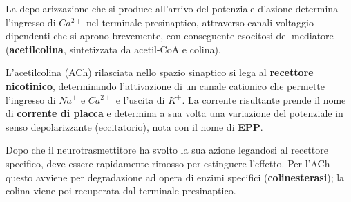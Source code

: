 La depolarizzazione che si produce all'arrivo del potenziale d'azione determina l'ingresso di $Ca^{2+}$ nel terminale presinaptico, attraverso canali voltaggio-dipendenti che si aprono brevemente, con conseguente esocitosi del mediatore (\textbf{acetilcolina}, sintetizzata da acetil-CoA e colina).

L'acetilcolina (ACh) rilasciata nello spazio sinaptico si lega al \textbf{recettore nicotinico}, determinando l'attivazione di un canale cationico che permette l'ingresso di $Na^+$ e $Ca^{2+}$ e l'uscita di $K^+$. La corrente risultante prende il nome di \textbf{corrente di placca} e determina a sua volta una variazione del potenziale in senso depolarizzante (eccitatorio), nota con il nome di \textbf{EPP}.

Dopo che il neurotrasmettitore ha svolto la sua azione legandosi al recettore specifico, deve essere rapidamente rimosso per estinguere l'effetto. Per l'ACh questo avviene per degradazione ad opera di enzimi specifici (\textbf{colinesterasi}); la colina viene poi recuperata dal terminale presinaptico.

